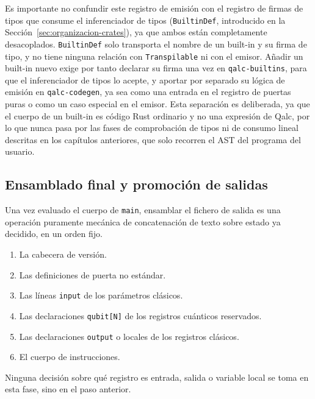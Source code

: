 Es importante no confundir este registro de emisión con el registro de firmas de tipos que consume el inferenciador de tipos (\lstinline|BuiltinDef|, introducido en la Sección~\ref{sec:organizacion-crates}), ya que ambos están completamente desacoplados. \lstinline|BuiltinDef| solo transporta el nombre de un built-in y su firma de tipo, y no tiene ninguna relación con \lstinline|Transpilable| ni con el emisor. Añadir un built-in nuevo exige por tanto declarar su firma una vez en \lstinline|qalc-builtins|, para que el inferenciador de tipos lo acepte, y aportar por separado su lógica de emisión en \lstinline|qalc-codegen|, ya sea como una entrada en el registro de puertas puras o como un caso especial en el emisor. Esta separación es deliberada, ya que el cuerpo de un built-in es código Rust ordinario y no una expresión de Qalc, por lo que nunca pasa por las fases de comprobación de tipos ni de consumo lineal descritas en los capítulos anteriores, que solo recorren el AST del programa del usuario.

\subsection{Ensamblado final y promoción de salidas}
\label{sec:assemble}

Una vez evaluado el cuerpo de \lstinline|main|, ensamblar el fichero de salida es una operación puramente mecánica de concatenación de texto sobre estado ya decidido, en un orden fijo.

\begin{enumerate}
  \item La cabecera de versión.
  \item Las definiciones de puerta no estándar.
  \item Las líneas \lstinline|input| de los parámetros clásicos.
  \item Las declaraciones \lstinline|qubit[N]| de los registros cuánticos reservados.
  \item Las declaraciones \lstinline|output| o locales de los registros clásicos.
  \item El cuerpo de instrucciones.
\end{enumerate}

Ninguna decisión sobre qué registro es entrada, salida o variable local se toma en esta fase, sino en el paso anterior.

